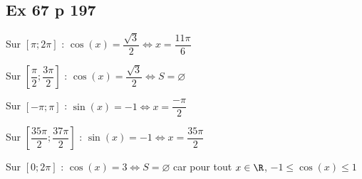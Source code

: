 \documentclass[a4paper,french]{book}
\begin{document}
\subsection*{Ex 67 p 197}
\begin{enumMet}
    \item
    \begin{enumMet}
        \item Sur $\left[\pi;2\pi\right]$ : $\cos(x)=\dfrac{\sqrt{3}}{2}\iff x=\dfrac{11\pi}{6}$
        \item Sur $\left[\dfrac{\pi}{2};\dfrac{3\pi}{2}\right]$ : $\cos(x)=\dfrac{\sqrt{3}}{2}\iff S=\varnothing$
    \end{enumMet}
    \item
    \begin{enumMet}
        \item Sur $\left[-\pi;\pi\right]$ : $\sin(x)=-1\iff x=\dfrac{-\pi}{2}$
        \item Sur $\left[\dfrac{35\pi}{2};\dfrac{37\pi}{2}\right]$ : $\sin(x)=-1\iff x=\dfrac{35\pi}{2}$
    \end{enumMet}
    \item Sur $\left[0;2\pi\right]$ : $\cos(x)=3\iff S=\varnothing$ car pour tout $x\in \R$, $-1\le \cos(x) \le 1$
\end{enumMet}
\end{document}
